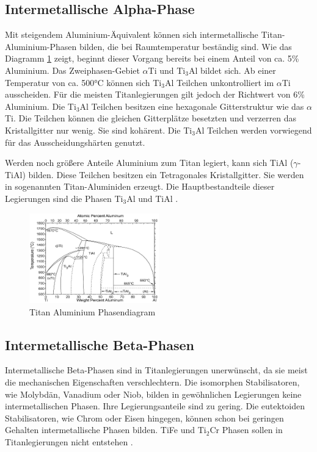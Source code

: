\documentclass[a4paper, 11pt]{tubsreprt}
\begin{document}
\subsection{Intermetallische Alpha-Phase}
Mit steigendem Aluminium-Äquivalent können sich intermetallische Titan-Aluminium-Phasen bilden, die bei Raumtemperatur beständig sind. Wie das Diagramm \ref{Titan Aluminium Phasendiagramm} zeigt, beginnt dieser Vorgang bereits bei einem Anteil von ca. 5\% Aluminium. Das Zweiphasen-Gebiet $\alpha$Ti und Ti$_{3}$Al bildet sich. Ab einer Temperatur von ca. 500°C können sich Ti$_{3}$Al Teilchen unkontrolliert im $\alpha$Ti ausscheiden. Für die meisten Titanlegierungen gilt jedoch der Richtwert von 6\% Aluminium. Die Ti$_{3}$Al Teilchen besitzen eine hexagonale Gitterstruktur wie das $\alpha$Ti. Die Teilchen können die gleichen Gitterplätze besetzten und verzerren das Kristallgitter nur wenig. Sie sind kohärent. Die Ti$_{3}$Al Teilchen werden vorwiegend für das Ausscheidungshärten genutzt.   

Werden noch größere Anteile Aluminium zum Titan legiert, kann sich TiAl ($\gamma$-TiAl) bilden. Diese Teilchen besitzen ein Tetragonales Kristallgitter. Sie werden in sogenannten Titan-Aluminiden erzeugt. Die Hauptbestandteile dieser Legierungen sind die Phasen Ti$_{3}$Al und TiAl \cite{Luetjering2007}.   
  
\begin{figure}
\centering
\includegraphics[width=0.5\textwidth]{Bilder/Titanaluminide.png}
\caption[Titan Aluminium Phasendiagramm]{Titan Aluminium Phasendiagram\cite{Luetjering2007}}
\label{Titan Aluminium Phasendiagramm}
\end{figure}
 
\subsection{Intermetallische Beta-Phasen}
Intermetallische Beta-Phasen sind in Titanlegierungen unerwünscht, da sie meist die mechanischen Eigenschaften verschlechtern. Die isomorphen Stabilisatoren, wie Molybdän, Vanadium oder Niob, bilden in gewöhnlichen Legierungen keine intermetallischen Phasen. Ihre Legierungsanteile sind zu gering. Die eutektoiden Stabilisatoren, wie Chrom oder Eisen hingegen, können schon bei geringen Gehalten intermetallische Phasen bilden. TiFe und Ti$_{2}$Cr Phasen sollen in Titanlegierungen nicht entstehen \cite{Luetjering2007}.   
\end{document}
